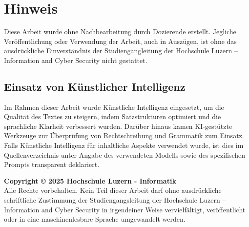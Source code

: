 \chapter*{\centering Hinweis}
\noindent
Diese Arbeit wurde ohne Nachbearbeitung durch Dozierende erstellt. Jegliche Veröffentlichung oder Verwendung der Arbeit, auch in Auszügen, ist ohne das ausdrückliche Einverständnis der Studiengangleitung der Hochschule Luzern – Information and Cyber Security nicht gestattet.

\section*{Einsatz von Künstlicher Intelligenz}
\noindent
Im Rahmen dieser Arbeit wurde Künstliche Intelligenz eingesetzt, um die Qualität des Textes zu steigern, indem Satzstrukturen optimiert und die sprachliche Klarheit verbessert wurden. Darüber hinaus kamen KI-gestützte Werkzeuge zur Überprüfung von Rechtschreibung und Grammatik zum Einsatz. Falls Künstliche Intelligenz für inhaltliche Aspekte verwendet wurde, ist dies im Quellenverzeichnis unter Angabe des verwendeten Modells sowie des spezifischen Prompts transparent deklariert.

\vspace{1cm}  %

\noindent
\textbf{Copyright © 2025 Hochschule Luzern - Informatik} \\[0.5cm]
Alle Rechte vorbehalten. Kein Teil dieser Arbeit darf ohne ausdrückliche schriftliche Zustimmung der Studiengangsleitung der Hochschule Luzern – Information and Cyber Security in irgendeiner Weise vervielfältigt, veröffentlicht oder in eine maschinenlesbare Sprache umgewandelt werden.
